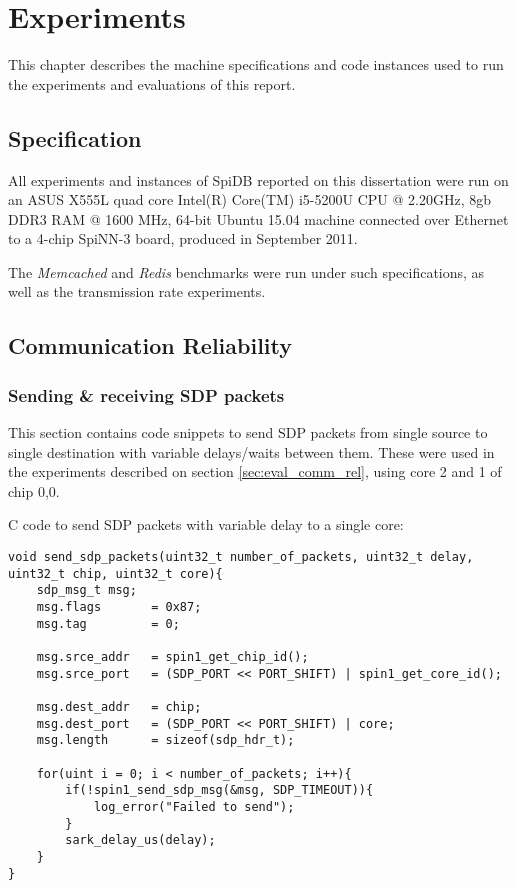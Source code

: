 \chapter{Experiments}
This chapter describes the machine specifications and code instances used to run the experiments and evaluations of this report.

\section{Specification}
\label{sec:appendix-specs}
All experiments and instances of SpiDB reported on this dissertation were run on an ASUS X555L quad core Intel(R) Core(TM) i5-5200U CPU @ 2.20GHz, 8gb DDR3 RAM @ 1600 MHz, 64-bit Ubuntu 15.04 machine connected over Ethernet to a 4-chip SpiNN-3 board, produced in September 2011.

The \textit{Memcached} and \textit{Redis} benchmarks were run under such specifications, as well as the transmission rate experiments.

\section{Communication Reliability}
\label{sec:appendix_comm_rel}

\subsection{Sending \& receiving SDP packets}

This section contains code snippets to send SDP packets from single source to single destination with variable delays/waits between them. These were used in the experiments described on section \ref{sec:eval_comm_rel}, using core 2 and 1 of chip 0,0.

C code to send SDP packets with variable delay to a single core:

\begin{lstlisting}[caption={Source}]
void send_sdp_packets(uint32_t number_of_packets, uint32_t delay, uint32_t chip, uint32_t core){
	sdp_msg_t msg;
    msg.flags       = 0x87;
    msg.tag         = 0;

    msg.srce_addr   = spin1_get_chip_id();
    msg.srce_port   = (SDP_PORT << PORT_SHIFT) | spin1_get_core_id();

    msg.dest_addr   = chip;
    msg.dest_port   = (SDP_PORT << PORT_SHIFT) | core;
    msg.length 		= sizeof(sdp_hdr_t);

    for(uint i = 0; i < number_of_packets; i++){
    	if(!spin1_send_sdp_msg(&msg, SDP_TIMEOUT)){
        	log_error("Failed to send");
        }
        sark_delay_us(delay);
    }
}
\end{lstlisting}

